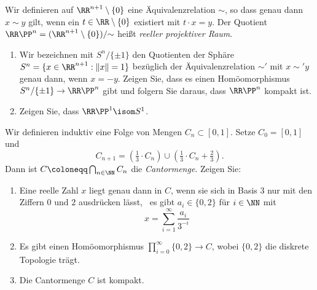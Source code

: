 \begin{exercise}
Wir definieren auf $\RR^{n+1}\setminus\{0\}$ eine Äquivalenzrelation ${\sim}$, so dass genau dann $x\sim y$ gilt, wenn ein $t\in\RR\setminus\{0\}$ existiert mit $t\cdot x = y$. Der Quotient $\RR\PP^n = (\RR^{n+1}\setminus\{0\})/{\sim}$ heißt \emph{reeller projektiver Raum}.
\begin{enumerate}
\item Wir bezeichnen mit $S^n/\{\pm 1\}$ den Quotienten der Sphäre $S^n = \{x\in \RR^{n+1} : \|x\| =1\}$ bezüglich der Äquivalenzrelation $\sim'$ mit $x\sim' y$ genau dann, wenn $x = -y$. Zeigen Sie, dass es einen Homöomorphismus $S^n/\{\pm 1\} \to \RR\PP^{n}$ gibt und folgern Sie daraus, dass $\RR\PP^n$ kompakt ist.
\item Zeigen Sie, dass $\RR\PP^{1} \isom S^1$.
\end{enumerate}
\end{exercise}

\begin{exercise}
Wir definieren induktiv eine Folge von Mengen $C_n\subset [0,1]$. Setze $C_0 = [0,1]$ und
\[
C_{n+1} = \left(\tfrac{1}{3}\cdot C_n\right) \cup \left(\tfrac{1}{3}\cdot C_n + \tfrac{2}{3}\right).
\]
Dann ist $C\coloneqq \bigcap_{n\in\NN} C_n$ die \emph{Cantormenge}. Zeigen Sie:
\begin{enumerate}
\item Eine reelle Zahl $x$ liegt genau dann in $C$, wenn sie sich in Basis $3$ nur mit den Ziffern $0$ und $2$ ausdrücken lässt, \ddh~es gibt $a_i\in\{0,2\}$ für $i\in \NN$ mit
\[
x = \sum_{i=1}^\infty \frac{a_i}{3^{-i}}
\]
\item Es gibt einen Homöomorphismus $\prod_{i=0}^\infty\{0,2\} \to C$, wobei $\{0,2\}$ die diskrete Topologie trägt.
\item Die Cantormenge $C$ ist kompakt.
\end{enumerate}
\end{exercise}

